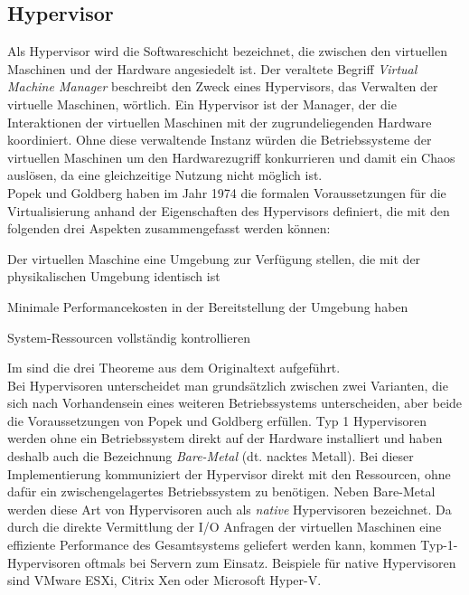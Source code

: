 \subsection{Hypervisor}
Als Hypervisor wird die Softwareschicht bezeichnet, die zwischen den virtuellen Maschinen und der Hardware angesiedelt ist. Der veraltete Begriff \textit{Virtual Machine Manager} beschreibt den Zweck eines Hypervisors, das Verwalten der virtuelle Maschinen, wörtlich. Ein Hypervisor ist der Manager, der die Interaktionen der virtuellen Maschinen mit der zugrundeliegenden Hardware koordiniert. Ohne diese verwaltende Instanz würden die Betriebssysteme der virtuellen Maschinen um den Hardwarezugriff konkurrieren und damit ein Chaos auslösen, da eine gleichzeitige Nutzung nicht möglich ist.~\cite[S.~41]{Portnoy2012}\medskip\\
Popek und Goldberg haben im Jahr 1974 die formalen Voraussetzungen für die Virtualisierung anhand der Eigenschaften des Hypervisors definiert, die mit den folgenden drei Aspekten zusammengefasst werden können:
\begin{compactitem}
    \item Der virtuellen Maschine eine Umgebung zur Verfügung stellen, die mit der physikalischen Umgebung identisch ist
    \item Minimale Performancekosten in der Bereitstellung der Umgebung haben
    \item System-Ressourcen vollständig kontrollieren \cite[S.~47 ff.]{Portnoy2012}
\end{compactitem}
Im  sind die drei Theoreme aus dem Originaltext aufgeführt.\medskip\\
Bei Hypervisoren unterscheidet man grundsätzlich zwischen zwei Varianten, die sich nach Vorhandensein eines weiteren Betriebssystems unterscheiden, aber beide die Voraussetzungen von Popek und Goldberg erfüllen.
Typ 1 Hypervisoren werden ohne ein Betriebssystem direkt auf der Hardware installiert und haben deshalb auch die Bezeichnung \textit{Bare-Metal} (dt. nacktes Metall). Bei dieser Implementierung kommuniziert der Hypervisor direkt mit den Ressourcen, ohne dafür ein zwischengelagertes Betriebssystem zu benötigen. Neben Bare-Metal werden diese Art von Hypervisoren auch als \textit{native} Hypervisoren bezeichnet. Da durch die direkte Vermittlung der I/O Anfragen der virtuellen Maschinen eine effiziente Performance des Gesamtsystems geliefert werden kann, kommen Typ-1-Hypervisoren oftmals bei Servern zum Einsatz. Beispiele für native Hypervisoren sind VMware ESXi, Citrix Xen oder Microsoft Hyper-V. \cite[S.~44]{Portnoy2012}\medskip\\
